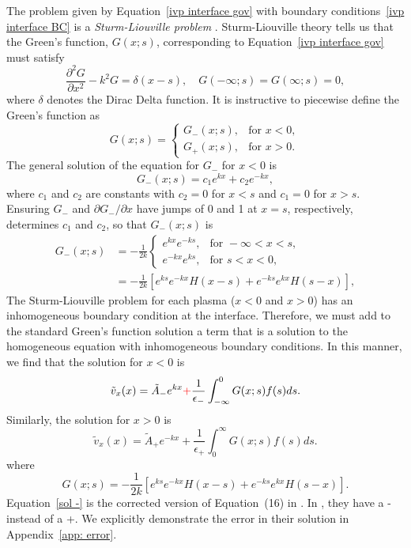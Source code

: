 \documentclass[12pt]{../style-files/ociamthesis}
\begin{document}
The problem given by Equation~\eqref{ivp interface gov} with boundary conditions~\eqref{ivp interface BC} is a \textit{Sturm-Liouville problem} \citep{boy_etal12}. Sturm-Liouville theory tells us that the Green's function, $G(x; s)$, corresponding to Equation~\eqref{ivp interface gov} must satisfy 
\begin{equation}
\frac{\partial^2G}{\partial x^2} - k^2 G = \delta(x-s), \quad G(-\infty; s) = G(\infty; s) = 0,
\end{equation}
where $\delta$ denotes the Dirac Delta function. It is instructive to piecewise define the Green's function as
\begin{equation}
G(x; s) = 
\begin{cases}
G_-(x; s), & \text{for } x < 0, \\
G_+(x; s), & \text{for } x > 0.
\end{cases}
\end{equation}
The general solution of the equation for $G_-$ for $x < 0$ is
\begin{equation}
G_-(x; s) = c_1e^{kx} + c_2e^{-kx},
\end{equation}
where $c_1$ and $c_2$ are constants with $c_2 = 0$ for $x < s$ and $c_1 = 0$ for $x > s$. Ensuring $G_-$ and $\partial G_- / \partial x$ have jumps of 0 and 1 at $x = s$, respectively, determines $c_1$ and $c_2$, so that $G_-(x;s)$ is
\begin{equation}
\begin{aligned}
G_-(x; s) & = -\frac{1}{2k} 
\begin{cases}
e^{kx}e^{-ks}, & \text{for } -\infty < x < s, \\
e^{-kx}e^{ks}, & \text{for } s< x < 0,
\end{cases} \\
& = - \frac{1}{2k}\left[e^{ks}e^{-kx}H(x-s) + e^{-ks}e^{kx}H(s-x)\right],
\end{aligned}
\end{equation}
The Sturm-Liouville problem for each plasma ($x < 0$ and $x > 0$) has an inhomogeneous boundary condition at the interface. Therefore, we must add to the standard Green's function solution a term that is a solution to the homogeneous equation with inhomogeneous boundary conditions. In this manner, we find that the solution for $x < 0$ is
\begin{equation}
\tilde{v}_x(x) = \tilde{A}_-e^{kx} \textcolor{red}{+} \frac{1}{\epsilon_-}\int_{-\infty}^{0} G(x; s) f(s) ds. \label{sol -}
\end{equation}
Similarly, the solution for $x > 0$ is
\begin{equation}
\tilde{v}_x(x) = \tilde{A}_+e^{-kx} + \frac{1}{\epsilon_+}\int_{0}^{\infty} G(x; s) f(s) ds. \label{sol +}
\end{equation}
where
\begin{equation}
G(x; s) = - \frac{1}{2k}\left[e^{ks}e^{-kx}H(x-s) + e^{-ks}e^{kx}H(s-x)\right].
\end{equation}
Equation~\eqref{sol -} is the corrected version of Equation~(16) in \cite{rae_etal81}. In \cite{rae_etal81}, they have a - instead of a +. We explicitly demonstrate the error in their solution in Appendix~\ref{app: error}.
\end{document}
